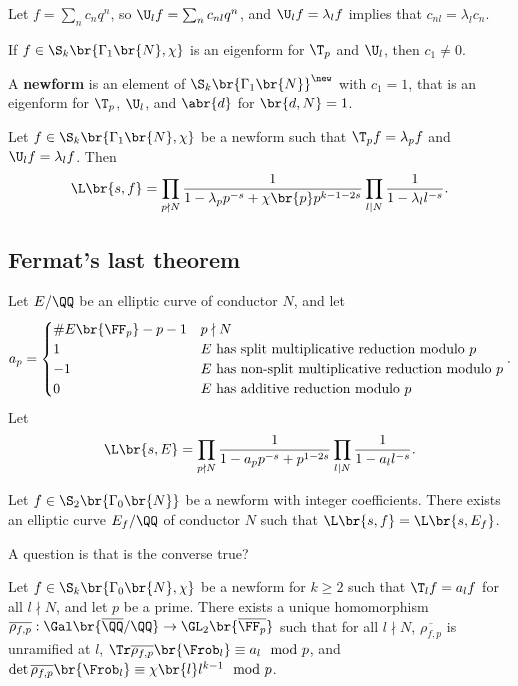 Let $ f = \sum_n c_nq^n $, so $ \U_lf = \sum_n c_{nl}q^n $, and $ \U_lf = \lambda_lf $ implies that $ c_{nl} = \lambda_lc_n $.

\begin{corollary}
If $ f \in \S_k\br{\Gamma_1\br{N}, \chi} $ is an eigenform for $ \T_p $ and $ \U_l $, then $ c_1 \ne 0 $.
\end{corollary}

\begin{definition}
A \textbf{newform} is an element of $ \S_k\br{\Gamma_1\br{N}}^{\new} $ with $ c_1 = 1 $, that is an eigenform for $ \T_p $, $ \U_l $, and $ \abr{d} $ for $ \br{d, N} = 1 $.
\end{definition}

Let $ f \in \S_k\br{\Gamma_1\br{N}, \chi} $ be a newform such that $ \T_pf = \lambda_pf $ and $ \U_lf = \lambda_lf $. Then
$$ \L\br{s, f} = \prod_{p \nmid N} \dfrac{1}{1 - \lambda_pp^{-s} + \chi\br{p}p^{k - 1 - 2s}}\prod_{l \mid N} \dfrac{1}{1 - \lambda_ll^{-s}}. $$

\subsection{Fermat's last theorem}

Let $ E / \QQ $ be an elliptic curve of conductor $ N $, and let
$$ a_p =
\begin{cases}
\#E\br{\FF_p} - p - 1 & p \nmid N \\
1 & E \ \text{has split multiplicative reduction modulo} \ p \\
-1 & E \ \text{has non-split multiplicative reduction modulo} \ p \\
0 & E \ \text{has additive reduction modulo} \ p
\end{cases}.
$$
Let
$$ \L\br{s, E} = \prod_{p \nmid N} \dfrac{1}{1 - a_pp^{-s} + p^{1 - 2s}}\prod_{l \mid N} \dfrac{1}{1 - a_ll^{-s}}. $$

\pagebreak

\begin{theorem}
Let $ f \in \S_2\br{\Gamma_0\br{N}} $ be a newform with integer coefficients. There exists an elliptic curve $ E_f / \QQ $ of conductor $ N $ such that $ \L\br{s, f} = \L\br{s, E_f} $.
\end{theorem}

A question is that is the converse true?


\begin{theorem}
Let $ f \in \S_k\br{\Gamma_0\br{N}, \chi} $ be a newform for $ k \ge 2 $ such that $ \T_lf = a_lf $ for all $ l \nmid N $, and let $ p $ be a prime. There exists a unique homomorphism $ \overline{\rho_{f, p}} : \Gal\br{\overline{\QQ} / \QQ} \to \GL_2\br{\overline{\FF_p}} $ such that for all $ l \nmid N $, $ \overline{\rho_{f, p}} $ is unramified at $ l $, $ \Tr \overline{\rho_{f, p}}\br{\Frob_l} \equiv a_l \mod p $, and $ \det \overline{\rho_{f, p}}\br{\Frob_l} \equiv \chi\br{l}l^{k - 1} \mod p $.
\end{theorem}

